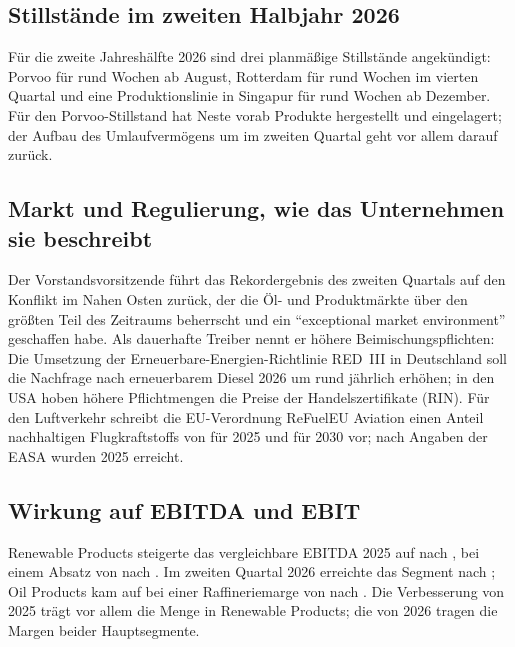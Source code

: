 \subsection{Stillst\"ande im zweiten Halbjahr 2026}

F\"ur die zweite Jahresh\"alfte 2026 sind drei planm\"a{\ss}ige Stillst\"ande angek\"undigt:
Porvoo f\"ur rund \StillstandPorvoo{} Wochen ab August, Rotterdam f\"ur rund
\StillstandRotterdam{} Wochen im vierten Quartal und eine Produktionslinie in Singapur f\"ur
rund \StillstandSingapur{} Wochen ab Dezember. F\"ur den Porvoo-Stillstand hat Neste
vorab Produkte hergestellt und eingelagert; der Aufbau des Umlaufverm\"ogens um
 im zweiten Quartal geht vor allem darauf zur\"uck.

\subsection{Markt und Regulierung, wie das Unternehmen sie beschreibt}

Der Vorstandsvorsitzende f\"uhrt das Rekordergebnis des zweiten Quartals auf den Konflikt
im Nahen Osten zur\"uck, der die \"Ol- und Produktm\"arkte \"uber den gr\"o{\ss}ten Teil des
Zeitraums beherrscht und ein \enquote{exceptional market environment} geschaffen habe.
Als dauerhafte Treiber nennt er h\"ohere Beimischungspflichten: Die Umsetzung der
Erneuerbare-Energien-Richtlinie RED~III in Deutschland soll die Nachfrage nach erneuerbarem
Diesel 2026 um rund  j\"ahrlich erh\"ohen; in den USA hoben
h\"ohere Pflichtmengen die Preise der Handelszertifikate (RIN). F\"ur den
Luftverkehr schreibt die EU-Verordnung ReFuelEU Aviation einen Anteil nachhaltigen
Flugkraftstoffs von \Pz{\SafQuoteZiel} f\"ur 2025 und \Pz{\SafQuoteZielDreissig} f\"ur 2030
vor; nach Angaben der EASA wurden 2025 \Pz{\SafQuoteIst} erreicht.

\subsection{Wirkung auf EBITDA und EBIT}

Renewable Products steigerte das vergleichbare EBITDA 2025 auf  nach
, bei einem Absatz von  nach
. Im zweiten Quartal 2026 erreichte das Segment
 nach ; Oil Products kam auf
 bei einer Raffineriemarge von  nach
. Die Verbesserung von 2025 tr\"agt vor allem die Menge
in Renewable Products; die von 2026 tragen die Margen beider Hauptsegmente.

